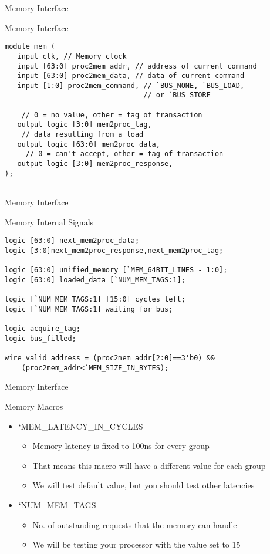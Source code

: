 \documentclass[table,dvipsnames]{beamer}
\begin{document}
\begin{frame}[fragile]{Memory Interface}
	\begin{block}{Memory Interface}
		\begin{verbatim}
module mem (
   input clk, // Memory clock
   input [63:0] proc2mem_addr, // address of current command 
   input [63:0] proc2mem_data, // data of current command
   input [1:0] proc2mem_command, // `BUS_NONE, `BUS_LOAD, 
                                 // or `BUS_STORE
	
	// 0 = no value, other = tag of transaction
   output logic [3:0] mem2proc_tag,
	// data resulting from a load
   output logic [63:0] mem2proc_data, 
	 // 0 = can't accept, other = tag of transaction 
   output logic [3:0] mem2proc_response,
);
	
		\end{verbatim}
	\end{block}
\end{frame}



\begin{frame}[fragile]{Memory Interface}
	\begin{block}{Memory Internal Signals}
		\begin{verbatim}
logic [63:0] next_mem2proc_data;
logic [3:0]next_mem2proc_response,next_mem2proc_tag; 

logic [63:0] unified_memory [`MEM_64BIT_LINES - 1:0];
logic [63:0] loaded_data [`NUM_MEM_TAGS:1]; 

logic [`NUM_MEM_TAGS:1] [15:0] cycles_left;
logic [`NUM_MEM_TAGS:1] waiting_for_bus; 

logic acquire_tag;
logic bus_filled;

wire valid_address = (proc2mem_addr[2:0]==3'b0) && 
	(proc2mem_addr<`MEM_SIZE_IN_BYTES);
		\end{verbatim}
	\end{block}
\end{frame}

\begin{frame}[fragile]{Memory Interface}
	\begin{block}{Memory Macros}
	\begin{itemize}
		\item `MEM\_LATENCY\_IN\_CYCLES
		\begin{itemize}
			\item Memory latency is fixed to 100ns for every group
			\item That means this macro will have a different value for each group
			\item We will test default value, but you should test other latencies
		\end{itemize}
		\item `NUM\_MEM\_TAGS
		\begin{itemize}
			\item No. of outstanding requests that the memory can handle
			\item We will be testing your processor with the value set to 15
		\end{itemize}
	\end{itemize}
	\end{block}
\end{frame}
\end{document}
